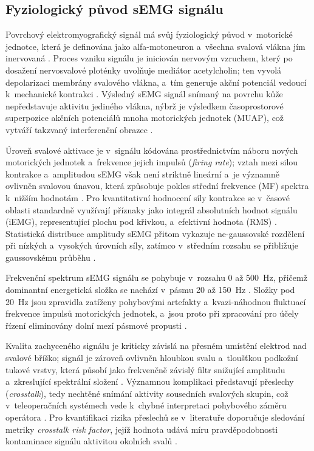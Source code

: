 \subsection{Fyziologický původ sEMG signálu}
Povrchový elektromyografický signál má svůj fyziologický původ v~motorické jednotce, která je definována jako alfa-motoneuron a~všechna svalová vlákna jím inervovaná \cite{Reaz2006, Stuchla2024}.
Proces vzniku signálu je iniciován nervovým vzruchem, který po dosažení nervosvalové ploténky uvolňuje mediátor acetylcholin; ten vyvolá depolarizaci membrány svalového vlákna, a~tím generuje akční potenciál vedoucí k~mechanické kontrakci \cite{ALCAN20231026, Reaz2006, Stuchla2024}.
Výsledný sEMG signál snímaný na povrchu kůže nepředstavuje aktivitu jediného vlákna, nýbrž je výsledkem časoprostorové superpozice akčních potenciálů mnoha motorických jednotek (MUAP), což vytváří takzvaný interferenční obrazec \cite{ALCAN20231026, Chowdhury2013917, Reaz2006, Song2023823, Sul2025627}.

Úroveň svalové aktivace je v~signálu kódována prostřednictvím náboru nových motorických jednotek a~frekvence jejich impulsů (\textit{firing rate}); vztah mezi silou kontrakce a~amplitudou sEMG však není striktně lineární a~je významně ovlivněn svalovou únavou, která způsobuje pokles střední frekvence (MF) spektra k~nižším hodnotám \cite{Chowdhury2013917, Reaz2006, Stuchla2024}.
Pro kvantitativní hodnocení síly kontrakce se v~časové oblasti standardně využívají příznaky jako integrál absolutních hodnot signálu (iEMG), representující plochu pod křivkou, a~efektivní hodnota (RMS) \cite{Wu2024613, Chowdhury2013917}.
Statistická distribuce amplitudy sEMG přitom vykazuje ne-gaussovské rozdělení při nízkých a~vysokých úrovních síly, zatímco v~středním rozsahu se přibližuje gaussovskému průběhu \cite{Chowdhury2013917}.

Frekvenční spektrum sEMG signálu se pohybuje v~rozsahu 0 až 500~Hz, přičemž dominantní energetická složka se nachází v~pásmu 20 až 150~Hz \cite{Reaz2006, Sul2025627, Wu2024613}.
Složky pod 20~Hz jsou zpravidla zatíženy pohybovými artefakty a~kvazi-náhodnou fluktuací frekvence impulsů motorických jednotek, a~jsou proto při zpracování pro účely řízení eliminovány dolní mezí pásmové propusti \cite{Chowdhury2013917, DeLuca2010, Reaz2006}.

Kvalita zachyceného signálu je kriticky závislá na přesném umístění elektrod nad svalové bříško; signál je zároveň ovlivněn hloubkou svalu a~tloušťkou podkožní tukové vrstvy, která působí jako frekvenčně závislý filtr snižující amplitudu a~zkreslující spektrální složení \cite{ALCAN20231026, Chowdhury2013917, Reaz2006}.
Významnou komplikaci představují přeslechy (\textit{crosstalk}), tedy nechtěné snímání aktivity sousedních svalových skupin, což v~teleoperačních systémech vede k~chybné interpretaci pohybového záměru operátora \cite{Chowdhury2013917, DeLuca2010, Sul2025627}.
Pro kvantifikaci rizika přeslechů se v~literatuře doporučuje sledování metriky \textit{crosstalk risk factor}, jejíž hodnota udává míru pravděpodobnosti kontaminace signálu aktivitou okolních svalů \cite{Wu2024613}.

